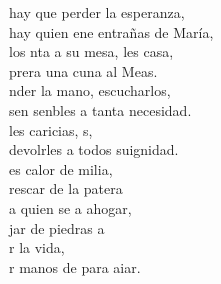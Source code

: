 \documentclass[12pt]{article}
\begin{document}
\begin{multicols*}{2}
\begin{cancion}
	 hay que perder la esperanza,\\
	hay quien ene entrañas de María,\\
	los nta a su mesa, les casa,\\
	prera una cuna al Meas. \\
\jump
	nder la mano, escucharlos,\\
	sen senbles a tanta necesidad.\\
	les caricias, s,\\
	devolrles a todos suignidad.\\
\jump
	es calor de milia,\\
	rescar de la patera \\
	a quien se  a ahogar,\\
	jar de  piedras a\\
	r la vida,\\
	r manos de  para aiar.\\
\end{cancion}%


\end{multicols*}
\end{document}
